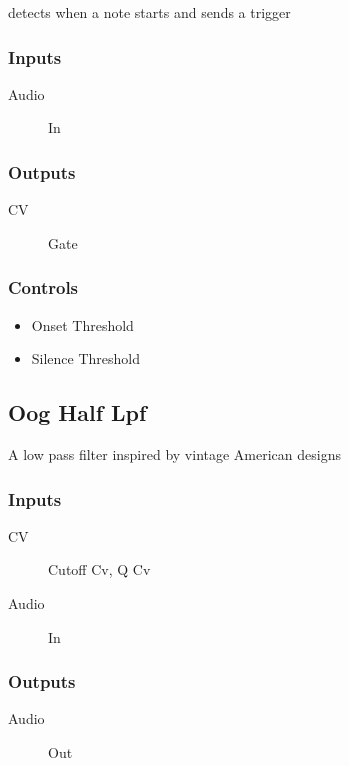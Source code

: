 detects when a note starts and sends a trigger



\subsubsection{Inputs}
\begin{description}
\item [Audio] In
\end{description}

\subsubsection{Outputs}
\begin{description}
\item [CV] Gate
\end{description}

\subsubsection{Controls}
\begin{itemize}
\item Onset Threshold
\item Silence Threshold
\end{itemize}

\subsection{Oog Half Lpf}

A low pass filter inspired by vintage American designs



\subsubsection{Inputs}
\begin{description}
\item [CV] Cutoff Cv, Q Cv
\item [Audio] In
\end{description}

\subsubsection{Outputs}
\begin{description}
\item [Audio] Out
\end{description}


